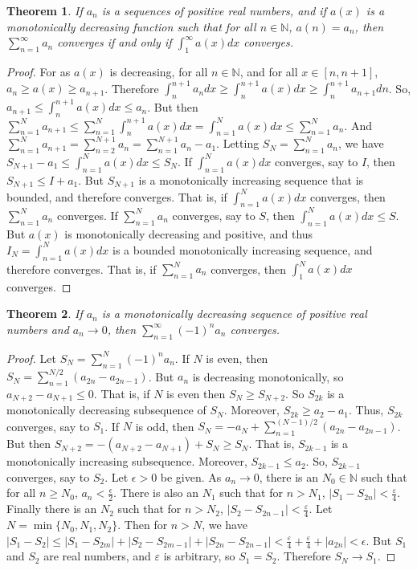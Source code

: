 \documentclass[oneside]{book}
\theoremstyle{mystyle}
\newtheorem*{theorem*}{Theorem}
\begin{document}
\begin{theorem*}
If $a_n$ is a sequences of positive real numbers, and if $a(x)$ is a monotonically decreasing function such that for all $n\in \mathbb{N}$, $a(n) = a_n$, then $\sum_{n=1}^{\infty} a_n$ converges if and only if $\int_{1}^{\infty} a(x)dx$ converges.
\end{theorem*}
\begin{proof}
For as $a(x)$ is decreasing, for all $n\in \mathbb{N}$, and for all $x\in [n,n+1]$, $a_n \geq a(x) \geq a_{n+1}$. Therefore $\int_{n}^{n+1}a_n dx \geq \int_{n}^{n+1} a(x)dx \geq \int_{n}^{n+1} a_{n+1}dn$. So, $a_{n+1} \leq \int_{n}^{n+1} a(x)dx \leq a_{n}$. But then $\sum_{n=1}^{N}a_{n+1} \leq \sum_{n=1}^{N}\int_{n}^{n+1}a(x)dx = \int_{n=1}^{N} a(x)dx \leq \sum_{n=1}^{N} a_n$. And $\sum_{n=1}^{N}a_{n+1} = \sum_{n=2}^{N+1} a_n = \sum_{n=1}^{N+1}a_n - a_1$. Letting $S_N = \sum_{n=1}^{N}a_n$, we have $S_{N+1} - a_1 \leq \int_{n=1}^{N} a(x)dx \leq S_N$. If $\int_{n=1}^{N}a(x)dx$ converges, say to $I$, then $S_{N+1} \leq I+a_{1}$. But $S_{N+1}$ is a monotonically increasing sequence that is bounded, and therefore converges. That is, if $\int_{n=1}^{N}a(x)dx$ converges, then $\sum_{n=1}^{N}a_n$ converges. If $\sum_{n=1}^{N} a_n$ converges, say to $S$, then $\int_{n=1}^{N}a(x)dx \leq S$. But $a(x)$ is monotonically decreasing and positive, and thus $I_{N} = \int_{n=1}^{N}a(x)dx$ is a bounded monotonically increasing sequence, and therefore converges. That is, if $\sum_{n=1}^{N}a_n$ converges, then $\int_{1}^{N}a(x)dx$ converges. 
\end{proof}

\begin{theorem*}
If $a_n$ is a monotonically decreasing sequence of positive real numbers and $a_n \rightarrow 0$, then $\sum_{n=1}^{\infty} (-1)^{n}a_n$ converges.
\end{theorem*}
\begin{proof}
Let $S_N = \sum_{n=1}^{N}(-1)^n a_n$. If $N$ is even, then $S_N = \sum_{n=1}^{N/2}(a_{2n}-a_{2n-1})$. But $a_n$ is decreasing monotonically, so $a_{N+2} - a_{N+1} \leq 0$. That is, if $N$ is even then $S_{N} \geq S_{N+2}$. So $S_{2k}$ is a monotonically decreasing subsequence of $S_{N}$. Moreover, $S_{2k} \geq a_{2} - a_{1}$. Thus, $S_{2k}$ converges, say to $S_1$. If $N$ is odd, then $S_{N} = -a_{N}+\sum_{n=1}^{(N-1)/2}(a_{2n} - a_{2n-1})$. But then $S_{N+2} = -(a_{N+2}-a_{N+1})+S_{N} \geq S_{N}$. That is, $S_{2k-1}$ is a monotonically increasing subsequence. Moreover, $S_{2k-1} \leq a_{2}$. So, $S_{2k-1}$ converges, say to $S_2$. Let $\epsilon>0$ be given. As $a_n \rightarrow 0$, there is an $N_{0}\in \mathbb{N}$ such that for all $n \geq N_{0}$, $a_{n} < \frac{\epsilon}{2}$. There is also an $N_{1}$ such that for $n>N_{1}$, $|S_1 - S_{2n}|<\frac{\varepsilon}{4}$. Finally there is an $N_2$ such that for $n>N_{2}$, $|S_2 - S_{2n-1}|<\frac{\varepsilon}{4}$. Let $N = \min\{N_0,N_1,N_2\}$. Then for $n>N$, we have $|S_1 - S_2| \leq |S_1 - S_{2m}|+|S_2 - S_{2m-1}| + |S_{2n} - S_{2n-1}|< \frac{\varepsilon}{4}+\frac{\varepsilon}{4} + |a_{2n}|<\epsilon$. But $S_1$ and $S_2$ are real numbers, and $\varepsilon$ is arbitrary, so $S_1 = S_2$. Therefore $S_N \rightarrow S_1$.
\end{proof}
\end{document}
